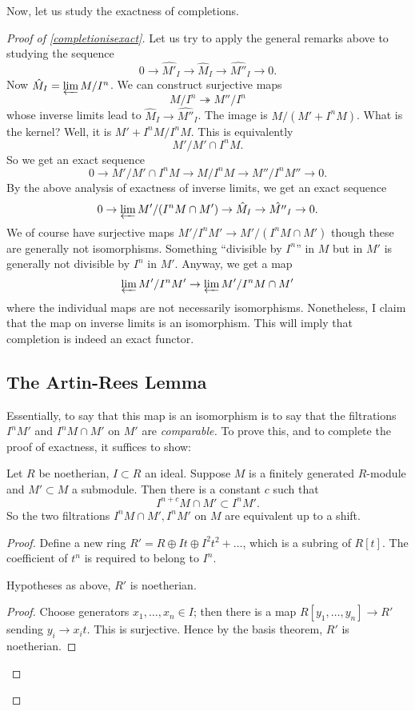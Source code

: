 Now, let us study the exactness of completions.
\begin{proof}[Proof of \cref{completionisexact}]

Let us try to apply the general remarks above to studying the sequence 
\[ 0 \to \hat{M'}_I \to \hat{M}_I \to \hat{M''}_I \to 0.  \]
Now $\hat{M}_I = \varprojlim M/I^n$. We can construct  surjective maps
\[ M/I^n \twoheadrightarrow M''/I^n  \]
whose inverse limits lead to $\hat{M}_I \to \hat{M''}_I$. The image is
$M/(M' + I^n M)$. What is the kernel?
Well, it is $M' + I^n M/ I^n M$.  This is equivalently
\[ M'/M' \cap I^n M.  \]
So we get an exact sequence
\[ 0 \to M'/M' \cap I^n M \to M/I^n M \to M''/I^n M'' \to 0.  \]
By the above analysis of exactness of inverse limits, we get an exact sequence
\[ 0 \to \varprojlim M'/(I^n M \cap M') \to \hat{M}_I \to \hat{M''}_I \to 0.  \]
We of course have surjective maps $M'/I^n M' \to M'/(I^n M \cap M') $ though
these are generally not isomorphisms. Something ``divisible by $I^n$'' in $M$ but
in $M'$ is generally not divisible by $I^n$ in $M'$.
Anyway, we get a map
\[ \varprojlim M'/I^n M' \to \varprojlim M'/I^n M \cap M'  \]
where the individual maps are not necessarily isomorphisms. Nonetheless, I
claim that the map on inverse limits is an isomorphism. This will imply that
completion is indeed an exact functor.


\subsection{The Artin-Rees Lemma}
Essentially, to say that this map is an isomorphism is to say that the
filtrations $I^n M'$ and $I^n M \cap M'$ on $M'$ are \emph{comparable.} To
prove this, and to complete the proof of exactness, it suffices to show:
\begin{proposition} Let $R$ be noetherian, $I \subset R$ an
ideal. Suppose $M$ is a finitely generated $R$-module and $M' \subset M$ a submodule. Then
there is a  constant $c$ such that
\[ I^{n+c} M \cap M' \subset I^n M'.  \]
So the two filtrations $I^n M \cap M', I^n M'$ on $M$ are equivalent up to a
shift.
\end{proposition} 
\begin{proof} 
Define a new ring $R' = R \oplus It \oplus I^2 t^2 + \dots$, which is a subring of
$R[t]$. The coefficient of $t^n $ is required to belong to $I^n$. 

\begin{lemma} 
Hypotheses as above, $R'$ is noetherian.
\end{lemma} 
\begin{proof} 
Choose generators $x_1, \dots, x_n \in I$; then there is a map $R[y_1, \dots,
y_n] \to R'$ sending $y_i \to x_i t$. This is surjective. Hence by the basis
theorem, $R'$ is noetherian.
\end{proof} 


\end{proof}
\end{proof}

